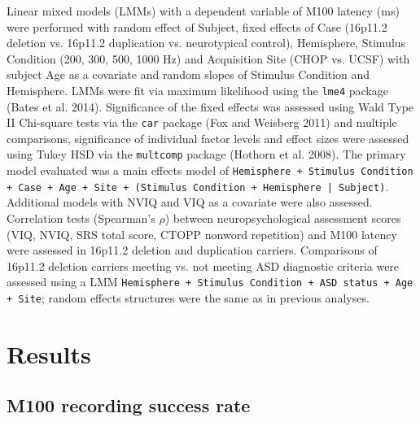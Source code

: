 \documentclass{article}
\begin{document}
Linear mixed models (LMMs) with a dependent variable of M100 latency (ms) were performed with random effect of Subject, fixed effects of Case (16p11.2 deletion vs. 16p11.2 duplication vs. neurotypical control), Hemisphere, Stimulus Condition (200, 300, 500, 1000 Hz) and Acquisition Site (CHOP vs. UCSF) with subject Age as a covariate and random slopes of Stimulus Condition and Hemisphere.  LMMs were fit via maximum likelihood using the \texttt{lme4} package (Bates et al. 2014). Significance of the fixed effects was assessed using Wald Type II Chi-square tests via the \texttt{car} package (Fox and Weisberg 2011) and multiple comparisons, significance of individual factor levels and effect sizes were assessed using Tukey HSD via the \texttt{multcomp} package (Hothorn et al. 2008). The primary model evaluated was a main effects model of \texttt{Hemisphere + Stimulus Condition + Case + Age + Site + (Stimulus Condition + Hemisphere | Subject)}. Additional models with NVIQ and VIQ as a covariate were also assessed. Correlation tests (Spearman’s $\rho$) between neuropsychological assessment scores (VIQ, NVIQ, SRS total score, CTOPP non\-word repetition) and M100 latency were assessed in 16p11.2 deletion and duplication carriers. Comparisons of 16p11.2 deletion carriers meeting vs. not meeting ASD diagnostic criteria were assessed using a LMM \texttt{Hemisphere + Stimulus Condition + ASD status + Age + Site}; random effects structures were the same as in previous analyses.

\section{Results}

\subsection{M100 recording success rate}
\end{document}
